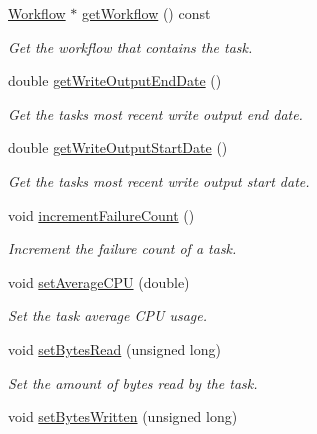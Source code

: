 \begin{DoxyCompactItemize}
\hyperlink{classwrench_1_1_workflow}{Workflow} $\ast$ \hyperlink{classwrench_1_1_workflow_task_aea29ebd47e1e3a1b955fafc0e72dff50}{get\+Workflow} () const
\begin{DoxyCompactList}\small\item\em Get the workflow that contains the task. \end{DoxyCompactList}\item 
double \hyperlink{classwrench_1_1_workflow_task_aa9a538645c4946f7a257d66a80d45401}{get\+Write\+Output\+End\+Date} ()
\begin{DoxyCompactList}\small\item\em Get the task\textquotesingle{}s most recent write output end date. \end{DoxyCompactList}\item 
double \hyperlink{classwrench_1_1_workflow_task_a2905c939f467778439fea8a956b0381b}{get\+Write\+Output\+Start\+Date} ()
\begin{DoxyCompactList}\small\item\em Get the task\textquotesingle{}s most recent write output start date. \end{DoxyCompactList}\item 
\mbox{\label{classwrench_1_1_workflow_task_a0af741652c38f6165bdf03195b84becf}} 
void \hyperlink{classwrench_1_1_workflow_task_a0af741652c38f6165bdf03195b84becf}{increment\+Failure\+Count} ()
\begin{DoxyCompactList}\small\item\em Increment the failure count of a task. \end{DoxyCompactList}\item 
void \hyperlink{classwrench_1_1_workflow_task_a8f4207c4fc2eea8f6370701a747a5238}{set\+Average\+C\+PU} (double)
\begin{DoxyCompactList}\small\item\em Set the task average C\+PU usage. \end{DoxyCompactList}\item 
void \hyperlink{classwrench_1_1_workflow_task_ab438ab4409f1ddcb423c90577a611fe6}{set\+Bytes\+Read} (unsigned long)
\begin{DoxyCompactList}\small\item\em Set the amount of bytes read by the task. \end{DoxyCompactList}\item 
void \hyperlink{classwrench_1_1_workflow_task_a8291e3248b7246eab498fc0378199b76}{set\+Bytes\+Written} (unsigned long)

\end{DoxyCompactItemize}
